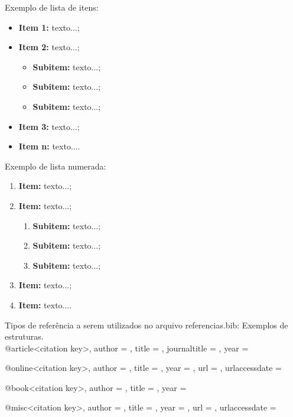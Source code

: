 Exemplo de lista de itens:

\begin{itemize}
	\item \textbf{Item 1:} texto...;
	\item \textbf{Item 2:} texto...;
    \begin{itemize}
            \item \textbf{Subitem:} texto...;
            \item \textbf{Subitem:} texto...;
            \item \textbf{Subitem:} texto...;
        \end{itemize}
	\item \textbf{Item 3:} texto...;
	\item \textbf{Item n:} texto....
\end{itemize}


Exemplo de lista numerada:

\begin{enumerate}
	\item \textbf{Item:} texto...;
	\item \textbf{Item:} texto...;
    \begin{enumerate}
        \item \textbf{Subitem:} texto...;
        \item \textbf{Subitem:} texto...;
        \item \textbf{Subitem:} texto...;
    \end{enumerate}
	\item \textbf{Item:} texto...;
	\item \textbf{Item:} texto....
\end{enumerate}

Tipos de referência a serem utilizados no arquivo referencias.bib:
Exemplos de estruturas.\\

@article{<citation key>,
    author        = {},
    title         = {},
    journaltitle  = {},
    year          = {}
}

@online{<citation key>,
    author        = {},
    title         = {},
    year          = {},
    url           = {},
    urlaccessdate = {}
}

@book{<citation key>,
    author        = {},
    title         = {},
    year          = {}
}

@misc{<citation key>,
    author        = {},
    title         = {},
    year          = {},
    url           = {},
    urlaccessdate = {}
}

